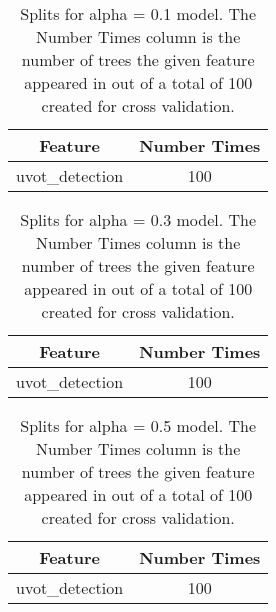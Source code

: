 \begin{table}[H]
\begin{center}
\begin{tabular}{cc}
  \hline
Feature & Number Times \\ 
  \hline
uvot\_detection & 100 \\ 
   \hline
\end{tabular}
\caption{Splits for alpha = 0.1 model. The Number Times column is the number of trees the given feature appeared in out of a total of 100 created for cross validation.}
\end{center}
\end{table}
\begin{table}[H]
\begin{center}
\begin{tabular}{cc}
  \hline
Feature & Number Times \\ 
  \hline
uvot\_detection & 100 \\ 
   \hline
\end{tabular}
\caption{Splits for alpha = 0.3 model. The Number Times column is the number of trees the given feature appeared in out of a total of 100 created for cross validation.}
\end{center}
\end{table}
\begin{table}[H]
\begin{center}
\begin{tabular}{cc}
  \hline
Feature & Number Times \\ 
  \hline
uvot\_detection & 100 \\ 
   \hline
\end{tabular}
\caption{Splits for alpha = 0.5 model. The Number Times column is the number of trees the given feature appeared in out of a total of 100 created for cross validation.}
\end{center}
\end{table}
